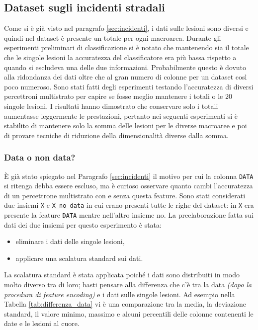 \documentclass[12pt, twoside, letterpaper]{report}
\begin{document}
		\subsection{Dataset sugli incidenti stradali}
			Come si è già visto nel paragrafo \ref{sec:incidenti}, i dati sulle lesioni sono diversi e quindi nel dataset è presente un totale per ogni macroarea. Durante gli esperimenti preliminari di classificazione si è notato che mantenendo sia il totale che le singole lesioni la accuratezza del classificatore era più bassa rispetto a quando si escludeva una delle due informazioni. Probabilmente questo è dovuto alla ridondanza dei dati oltre che al gran numero di colonne per un dataset così poco numeroso. Sono stati fatti degli esperimenti testando l'accuratezza di diversi percettroni multistrato per capire se fosse meglio mantenere i totali o le 20 singole lesioni. I risultati hanno dimostrato che conservare solo i totali aumentasse leggermente le prestazioni, pertanto nei seguenti esperimenti si è stabilito di mantenere solo la somma delle lesioni per le diverse macroaree e poi di provare tecniche di riduzione della dimensionalità diverse dalla somma.
			
			\subsubsection{Data o non data?}			
				È già stato spiegato nel Paragrafo \ref{sec:incidenti} il motivo per cui la colonna \texttt{DATA} si ritenga debba essere escluso, ma è curioso osservare quanto cambi l'accuratezza di un percettrone multistrato con e senza questa feature. Sono stati considerati due insiemi \texttt{X} e \texttt{X\_no\_data} in cui erano presenti tutte le righe del dataset: in \texttt{X} era presente la feature \texttt{DATA} mentre nell'altro insieme no. La preelaborazione fatta sui dati dei due insiemi per questo esperimento è stata: 
				\begin{itemize}
					\item eliminare i dati delle singole lesioni,
					\item applicare una scalatura standard sui dati.
				\end{itemize}
				La scalatura standard è stata applicata poiché i dati sono distribuiti in modo molto diverso tra di loro; basti pensare alla differenza che c'è tra la data \textit{(dopo la procedura di feature encoding)} e i dati sulle singole lesioni. Ad esempio nella Tabella \ref{tab:differenza_data} vi è una comparazione tra la media, la deviazione standard, il valore minimo, massimo e alcuni percentili delle colonne contenenti le date e le lesioni al cuore.
				
\end{document}
